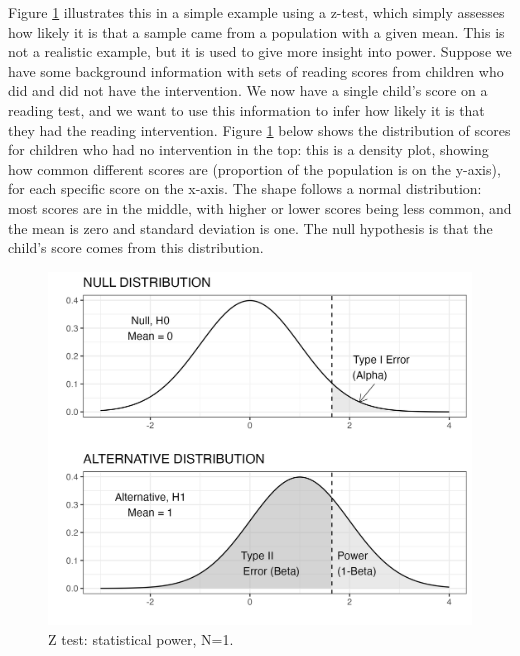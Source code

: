 \documentclass{krantz}
\begin{document}
Figure \ref{fig:densplot} illustrates this in a simple example using a z-test, which simply assesses how likely it is that a sample came from a population with a given mean. This is not a realistic example, but it is used to give more insight into power. Suppose we have some background information with sets of reading scores from children who did and did not have the intervention. We now have a single child's score on a reading test, and we want to use this information to infer how likely it is that they had the reading intervention. Figure \ref{fig:densplot} below shows the distribution of scores for children who had no intervention in the top: this is a density plot, showing how common different scores are (proportion of the population is on the y-axis), for each specific score on the x-axis. The shape follows a normal distribution: most scores are in the middle, with higher or lower scores being less common, and the mean is zero and standard deviation is one. The null hypothesis is that the child's score comes from this distribution.

\begin{figure}
\includegraphics[width=0.75\linewidth]{images_bw/densplot1} \caption{Z test: statistical power, N=1.}\label{fig:densplot}
\end{figure}
\end{document}
